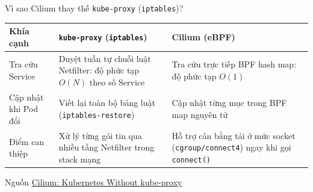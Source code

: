 \begin{frame}{Vì sao Cilium thay thế \texttt{kube-proxy} (\texttt{iptables})?}
  \small
  \renewcommand{\arraystretch}{1.35}
  \begin{tabular}{@{}L{0.22\textwidth}L{0.34\textwidth}L{0.36\textwidth}@{}}
    \toprule
    \textbf{Khía cạnh} & \textbf{\texttt{kube-proxy} (\texttt{iptables})} & \textbf{Cilium (eBPF)} \\
    \midrule
    Tra cứu Service & Duyệt tuần tự chuỗi luật Netfilter: độ phức tạp $O(N)$ theo số Service & Tra cứu trực tiếp BPF hash map: độ phức tạp $O(1)$ \\
    Cập nhật khi Pod đổi & Viết lại toàn bộ bảng luật (\texttt{iptables-restore}) & Cập nhật từng mục trong BPF map nguyên tử \\
    Điểm can thiệp & Xử lý từng gói tin qua nhiều tầng Netfilter trong stack mạng & Hỗ trợ cân bằng tải ở mức socket (\texttt{cgroup/connect4}) ngay khi gọi \texttt{connect()} \\
    \bottomrule
  \end{tabular}
  \medskip

  \smallskip
  {\scriptsize Nguồn \href{https://docs.cilium.io/en/stable/network/kubernetes/kubeproxy-free/}{Cilium: Kubernetes Without kube-proxy}}
\end{frame}


